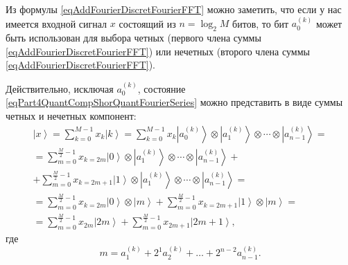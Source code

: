 Из формулы \eqref{eqAddFourierDiscretFourierFFT} можно
заметить, что если у нас имеется входной сигнал $x$ состоящий из $n =
\log_2{M}$ 
битов, то бит $a^{(k)}_0$ может быть использован для выбора четных
(первого члена суммы \eqref{eqAddFourierDiscretFourierFFT})
или нечетных 
(второго члена суммы \eqref{eqAddFourierDiscretFourierFFT}).

Действительно, исключая $a^{(k)}_0$, состояние
\eqref{eqPart4QuantCompShorQuantFourierSeries} можно представить в
виде суммы четных и нечетных компонент: 
\begin{eqnarray}
\left|x\right> = \sum_{k = 0}^{M - 1}x_k \left|k\right> = 
\sum_{k = 0}^{M - 1}x_k \left|a^{(k)}_0\right> \otimes  \left|a^{(k)}_1\right>
\otimes \cdots \otimes \left|a^{(k)}_{n-1}\right> = 
\nonumber \\
 = \sum_{m = 0}^{\frac{M}{2} - 1}x_{k=2m} \left|0\right> \otimes  \left|a^{(k)}_1\right>
\otimes \cdots \otimes \left|a^{(k)}_{n-1}\right> +
\nonumber \\
+
\sum_{m = 0}^{\frac{M}{2} - 1}x_{k=2m + 1} \left|1\right> \otimes  \left|a^{(k)}_1\right>
\otimes \cdots \otimes \left|a^{(k)}_{n-1}\right> = 
\nonumber \\
 = \sum_{m = 0}^{\frac{M}{2} - 1}x_{k=2m} \left|0\right> \otimes  \left|m\right> +
\sum_{m = 0}^{\frac{M}{2} - 1}x_{k=2m + 1} \left|1\right> \otimes  \left|m\right> = 
\nonumber \\
= \sum_{m = 0}^{\frac{M}{2} - 1}x_{2m} \left|2m\right> +
\sum_{m = 0}^{\frac{M}{2} - 1}x_{2m + 1} \left|2m+1\right>,
\nonumber
\end{eqnarray}
где
\begin{equation}
m = a^{(k)}_1 + 2^1 a^{(k)}_2 + \dots + 2^{n-2} a^{(k)}_{n-1}.
\nonumber
\end{equation}



